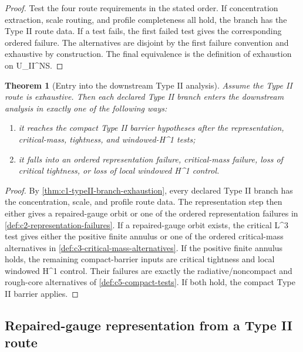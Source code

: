 \documentclass[11pt]{amsart}
\def\({}%
\def\){}%
\def\mathrm#1{#1}%
\theoremstyle{plain}
\newtheorem{theorem}{Theorem}[section]
\theoremstyle{definition}
\theoremstyle{remark}
\begin{document}
\begin{proof}
Test the four route requirements in the stated order.  If concentration
extraction, scale routing, and profile completeness all hold, the branch has
the Type II route data.  If a test fails, the first failed test gives the
corresponding ordered failure.  The alternatives are disjoint by the first
failure convention and exhaustive by construction.  The final equivalence is
the definition of exhaustion on \(\mathcal U_{\mathrm{II}}^{NS}\).
\end{proof}

\begin{theorem}[Entry into the downstream Type II analysis]
\label{thm:c1-downstream-entry}
Assume the Type II route is exhaustive.  Then each declared Type II branch
enters the downstream analysis in exactly one of the following ways:
\begin{enumerate}[label=\textup{(\roman*)}]
\item it reaches the compact Type II barrier hypotheses after the
representation, critical-mass, tightness, and windowed-\(H^1\) tests;
\item it falls into an ordered representation failure, critical-mass failure,
loss of critical tightness, or loss of local windowed \(H^1\) control.
\end{enumerate}
\end{theorem}

\begin{proof}
By \cref{thm:c1-typeII-branch-exhaustion}, every declared Type II branch has
the concentration, scale, and profile route data.  The representation step then
either gives a repaired-gauge orbit or one of the ordered representation
failures in \cref{def:c2-representation-failures}.  If a repaired-gauge orbit
exists, the critical \(L^3\) test gives either the positive finite annulus or
one of the ordered critical-mass alternatives in
\cref{def:c3-critical-mass-alternatives}.  If the positive finite annulus
holds, the remaining compact-barrier inputs are critical tightness and local
windowed \(H^1\) control.  Their failures are exactly the radiative/noncompact
and rough-core alternatives of \cref{def:c5-compact-tests}.  If both hold, the
compact Type II barrier applies.
\end{proof}

\subsection{Repaired-gauge representation from a Type II route}
\end{document}
